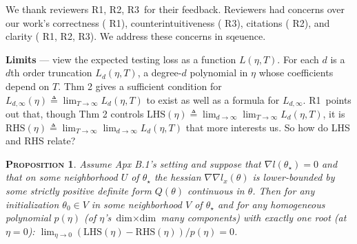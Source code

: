\documentclass{article}
\newcommand{\Ra}{\textmd{\textsf{\color{purple!50} {R1}}}}
\newcommand{\Rb}{\textmd{\textsf{\color{green!50}  {R2}}}}
\newcommand{\Rc}{\textmd{\textsf{\color{blue!50}   {R3}}}}
\newcommand{\apx}[1]{\textmd{\textsf{Apx #1}}}
\newcommand{\thm}[1]{\textmd{\textsf{Thm #1}}}
\newcommand{\prp}[1]{\textmd{\textsf{Prp #1}}}
\newcommand{\moosect}[1]{\par\noindent\textbf{#1} ---}
\newtheorem*{proposition*}{{\textsc{Proposition}}}
\begin{document}
    We thank reviewers \Ra, \Rb, \Rc\ for their feedback.  Reviewers had
    concerns over our work's correctness (\Ra), counterintuitiveness (\Rc), 
    citations (\Rb), and clarity (\Ra,\Rb,\Rc).  We address these concerns in
    sqeuence. 

\moosect{Limits}
    view the expected testing loss as a function
    $L(\eta, T)$.  For each $d$ is a $d$th order truncation $L_d(\eta, T)$, a
    degree-$d$ polynomial in $\eta$ whose coefficients depend on $T$.
    \thm{2} gives a sufficient condition for $L_{d,\infty}(\eta) \triangleq
    \lim_{T\to\infty} L_{d}(\eta,T)$ to exist as well as 
    a formula for $L_{d,\infty}$. %
    \Ra\ points out that, though
    \thm{2} controls $\text{LHS}(\eta)\triangleq \lim_{d\to\infty}
    \lim_{T\to \infty} L_d(\eta,T)$, it is
    $\text{RHS}(\eta)\triangleq \lim_{T\to\infty} \lim_{d\to\infty}
    L_d(\eta,T)$ that more interests us.  So how do LHS and RHS relate?
    \begin{proposition*}\vspace{-0.25cm}
        Assume \apx{B.1}'s setting and suppose
        that $\nabla l(\theta_\star)=0$ and that on some neighborhood $U$ of
        $\theta_\star$ the hessian $\nabla\nabla l_x(\theta)$ is lower-bounded
        by some strictly positive definite form $Q(\theta)$ continuous in
        $\theta$.  \emph{Then} for any initialization $\theta_0\in V$ in some
        neighborhood $V$ of $\theta_\star$ and for any homogeneous polynomial
        $p(\eta)$ (of $\eta$'s $\text{dim}\times\text{dim}$ many components)
        with exactly one root (at $\eta=0$): $\lim_{\eta\to 0}
        (\text{LHS}(\eta)-\text{RHS}(\eta))/p(\eta) = 0$.\vspace{-0.25cm}
    \end{proposition*}
\end{document}
